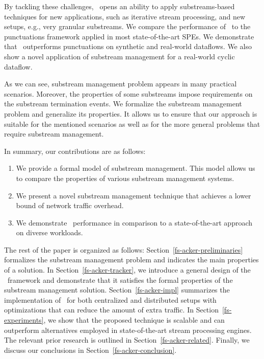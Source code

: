 By tackling these challenges, \tracker\ opens an ability to apply substreams-based techniques for new applications, such as iterative stream processing, and new setups, e.g., very granular substreams. We compare the performance of \tracker\ to the punctuations framework applied in most state-of-the-art SPEs. We demonstrate that \tracker\ outperforms punctuations on synthetic and real-world dataflows. We also show a novel application of substream management for a real-world cyclic dataflow. 

As we can see, substream management problem appears in many practical scenarios. Moreover, the properties of some substreams impose requirements on the substream termination events. We formalize the substream management problem and generalize its properties. It allows us to ensure that our approach is suitable for the mentioned scenarios as well as for the more general problems that require substream management.

In summary, our contributions are as follows:
\begin{enumerate}
    \item We provide a formal model of substream management. This model allows us to compare the properties of various substream management systems.
    \item We present a novel substream management technique that achieves a lower bound of network traffic overhead.
    \item We demonstrate \tracker\ performance in comparison to a state-of-the-art approach on diverse workloads.
\end{enumerate}

The rest of the paper is organized as follows: Section~\ref{fs-acker-preliminaries} formalizes the substream management problem and indicates the main properties of a solution. In Section~\ref{fs-acker-tracker}, we introduce a general design of the \tracker\ framework and demonstrate that it satisfies the formal properties of the substream management solution. Section~\ref{fs-acker-impl} summarizes the implementation of \tracker\ for both centralized and distributed setups with optimizations that can reduce the amount of extra traffic. In Section~\ref{fs-experiments}, we show that the proposed technique is scalable and can outperform alternatives employed in state-of-the-art stream processing engines. The relevant prior research is outlined in Section~\ref{fs-acker-related}. Finally, we discuss our conclusions in Section~\ref{fs-acker-conclusion}.